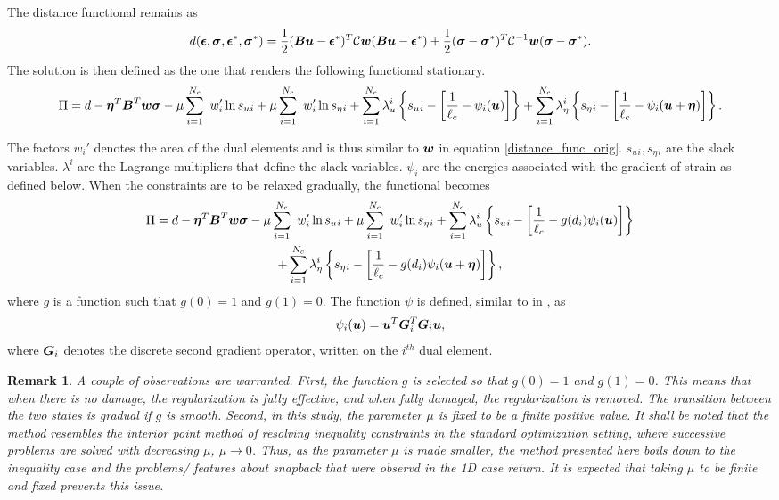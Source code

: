 \documentclass[10pt]{elsarticle}
\newtheorem*{remark}{Remark}
\begin{document}
The distance functional remains as
\begin{equation}
	d(\mbox{\boldmath $\epsilon$},\mbox{\boldmath $\sigma$},\mbox{\boldmath $\epsilon$}^*,\mbox{\boldmath $\sigma$}^*) = \frac{1}{2}(\mbox{\boldmath $B$} \mbox{\boldmath $u$} - \mbox{\boldmath $\epsilon$}^*)^T\mathcal{C}\mbox{\boldmath $w$}(\mbox{\boldmath $B$} \mbox{\boldmath $u$} - \mbox{\boldmath $\epsilon$}^*) + \frac{1}{2}(\mbox{\boldmath $\sigma$} - \mbox{\boldmath $\sigma$}^*)^T\mathcal{C}^{-1}\mbox{\boldmath $w$}(\mbox{\boldmath $\sigma$} - \mbox{\boldmath $\sigma$}^*).
\end{equation}
The solution is then defined as the one that renders the following functional stationary.
\begin{equation}
	\Pi  = d -\mbox{\boldmath $\eta$} ^T \mbox{\boldmath $B$}^T \mbox{\boldmath $w$} \mbox{\boldmath $\sigma$} - \mu \sum_{i=1}^{N_c} \
	w_i' \ln s_u{_i} + \mu \sum_{i=1}^{N_c} \
	w_i' \ln s_\eta{_i} +\sum_{i=1}^{N_c} \lambda_u^ i \left\{ s_u{_i}  - \left[ \frac{1}{\ell_c}- \psi_i(\mbox{\boldmath $u$}) \right]  \right\} 
	+\sum_{i=1}^{N_c} \lambda_\eta^ i \left\{ s_\eta{_i}  - \left[ \frac{1}{\ell_c}- \psi_i(\mbox{\boldmath $u$}+\mbox{\boldmath $\eta$}) \right]  \right\}.
\end{equation}

The factors $ w_i'$ denotes the area of the dual elements and is thus similar to $ \mbox{\boldmath $w$}$ in equation \ref{distance_func_orig}. $s_u{_i},s_\eta{_i}$ are the slack variables. $\lambda^i$ are the Lagrange multipliers that define the slack variables. $\psi_i$ are the energies associated with the gradient of strain as defined below. When the constraints are to be relaxed gradually, the functional becomes
\begin{multline}
	\Pi  = d -\mbox{\boldmath $\eta$} ^T \mbox{\boldmath $B$}^T \mbox{\boldmath $w$} \mbox{\boldmath $\sigma$} - \mu \sum_{i=1}^{N_c} \
	w_i' \ln s_u{_i} + \mu \sum_{i=1}^{N_c} \
	w_i' \ln s_\eta{_i} +\sum_{i=1}^{N_c} \lambda_u^ i \left\{ s_u{_i}  - \left[ \frac{1}{\ell_c}- g(d_i)\psi_i(\mbox{\boldmath $u$}) \right]  \right\} \\
	+\sum_{i=1}^{N_c} \lambda_\eta^ i \left\{ s_\eta{_i}  - \left[ \frac{1}{\ell_c}-g(d_i) \psi_i(\mbox{\boldmath $u$}+\mbox{\boldmath $\eta$}) \right]  \right\}, \label{lagrangian_interior_point}
\end{multline}
where $g$ is a function such that $g(0)=1$ and $g(1)=0$. The function $\psi$ is defined, similar to in \cite{Mindlin1968}, as 
\begin{equation}
	\psi_i(\mbox{\boldmath $u$} ) = \mbox{\boldmath $u$} ^T \mbox{\boldmath $G$}_i ^T \mbox{\boldmath $G$}_i \mbox{\boldmath $u$},
\end{equation}
where $\mbox{\boldmath $G$}_i$ denotes the discrete second gradient operator, written on the $i^{th}$ dual element.

\begin{remark}
	A couple of observations are warranted. First, the function $g$ is selected so that $g(0)=1$ and $g(1)=0$. This means that when there is no damage, the regularization is fully effective, and when fully damaged, the regularization is removed. The transition between the two states is gradual if $g$ is smooth. Second, in this study, the parameter $\mu$ is fixed to be a finite positive value. It shall be noted that the method resembles the interior point method of resolving inequality constraints in the standard optimization setting, where successive problems are solved with decreasing $\mu$, $\mu \to 0$. Thus, as the parameter $\mu$ is made smaller, the method presented here boils down to the inequality case and the problems/ features about snapback that were observd in the 1D case return. It is expected that taking $\mu$ to be finite and fixed prevents this issue. 
\end{remark}
\end{document}
